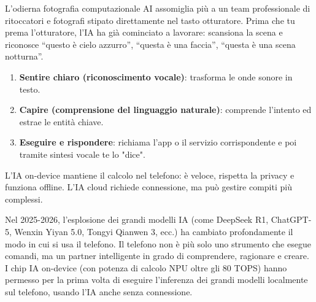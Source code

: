 


L'odierna fotografia computazionale AI assomiglia più a un team professionale di ritoccatori e fotografi stipato direttamente nel tasto otturatore. Prima che tu prema l'otturatore, l'IA ha già cominciato a lavorare: scansiona la scena e riconosce “questo è cielo azzurro”, “questa è una faccia”, “questa è una scena notturna”.


\begin{enumerate}
  \item \textbf{Sentire chiaro (riconoscimento vocale)}: trasforma le onde sonore in testo.
  \item \textbf{Capire (comprensione del linguaggio naturale)}: comprende l'intento ed estrae le entità chiave.
  \item \textbf{Eseguire e rispondere}: richiama l'app o il servizio corrispondente e poi tramite sintesi vocale te lo "dice".
\end{enumerate}


L'IA on-device mantiene il calcolo nel telefono: è veloce, rispetta la privacy e funziona offline. L'IA cloud richiede connessione, ma può gestire compiti più complessi.


Nel 2025-2026, l'esplosione dei grandi modelli IA (come DeepSeek R1, ChatGPT-5, Wenxin Yiyan 5.0, Tongyi Qianwen 3, ecc.) ha cambiato profondamente il modo in cui si usa il telefono. Il telefono non è più solo uno strumento che esegue comandi, ma un partner intelligente in grado di comprendere, ragionare e creare. I chip IA on-device (con potenza di calcolo NPU oltre gli 80 TOPS) hanno permesso per la prima volta di eseguire l'inferenza dei grandi modelli localmente sul telefono, usando l'IA anche senza connessione.

